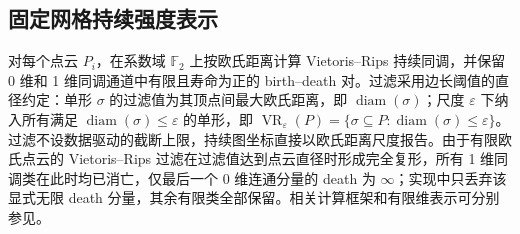 \subsection{固定网格持续强度表示}\label{sec:bpi}

对每个点云 $P_i$，在系数域 $\mathbb F_2$ 上按欧氏距离计算 Vietoris--Rips 持续同调，并保留 0 维和 1 维同调通道中有限且寿命为正的 birth--death 对。过滤采用边长阈值的直径约定：单形 $\sigma$ 的过滤值为其顶点间最大欧氏距离，即 $\operatorname{diam}(\sigma)$；尺度 $\varepsilon$ 下纳入所有满足 $\operatorname{diam}(\sigma)\le\varepsilon$ 的单形，即 $\operatorname{VR}_\varepsilon(P)=\{\sigma\subseteq P:\operatorname{diam}(\sigma)\le\varepsilon\}$。过滤不设数据驱动的截断上限，持续图坐标直接以欧氏距离尺度报告。由于有限欧氏点云的 Vietoris--Rips 过滤在过滤值达到点云直径时形成完全复形，所有 1 维同调类在此时均已消亡，仅最后一个 0 维连通分量的 death 为 $\infty$；实现中只丢弃该显式无限 death 分量，其余有限类全部保留。相关计算框架和有限维表示可分别参见\cite{Bauer2021,Adams2017}。

